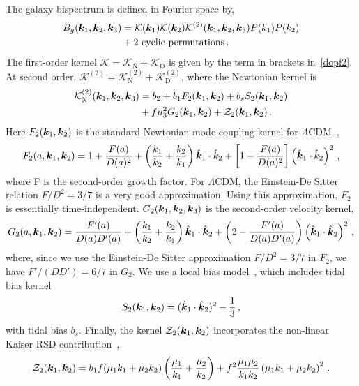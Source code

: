The galaxy bispectrum is defined in Fourier space by,
\begin{align}
B_{g}( \bm{k}_{1},  \bm{k}_{2},  \bm {k}_3) &= { \mathcal{K}( \bm {k}_{1})\mathcal{K}({\bm {k}}_{2}) \mathcal{K}^{(2)}(  \bm{k}_{1},  \bm{k}_{2}, \bm {k}_3)}
P(k_{1})P(k_{2}) \nonumber\\ 
&+\text{2 cyclic permutations}\,.\label{eq:fsbispdef}
\end{align}
The first-order kernel $\mathcal{K}=\mathcal{K}_{\mathrm{N}}+\mathcal{K}_{\mathrm{D}}$ is given by the term in brackets in~\eqref{dopf2}.
At second order, $\mathcal{K}^{(2)}=\mathcal{K}_{\mathrm{N}}^{(2)}+\mathcal{K}_{\mathrm{D}}^{(2)}$, where
 the Newtonian kernel is~\citep{Verde:1998zr}
\begin{align}
\mathcal{K}_{\mathrm{N}}^{(2)} (\bm {k}_1,\bm {k}_2,\bm {k}_3) &= b_{2} + b_{1}F_{2}(\bm {k}_1,\bm {k}_2) + b_s S_{2}(\bm {k}_1,\bm {k}_2) \nonumber \\
& + f \mu_3^{2} G_{2}(\bm {k}_1,\bm {k}_2)
+ {\cal Z}_2(\bm {k}_1,\bm {k}_2)\,.   \label{kn2}  
\end{align}
Here $F_2(\bm {k}_1,\bm {k}_2)$ is the standard Newtonian mode-coupling kernel for $\Lambda$CDM~\citep{Villa:2015ppa}, 
\begin{equation}
    F_2(a,\bm {k}_1,\bm {k}_2) = 1 + \frac{F(a)}{D(a)^2} + \left( \frac{k_1}{k_2} + \frac{k_2}{k_1} \right) \hat{\bm {k}}_1 \cdot \hat{k}_2 + \left[ 1 - \frac{F(a)}{D(a)^2} \right]\left( \hat{\bm {k}}_1 \cdot \hat{k}_2 \right)^2\,,
\end{equation}
where F is the second-order growth factor. For $\Lambda$CDM, the Einstein-De Sitter relation $F/D^2 = 3/7$ is a very good approximation. Using this approximation, $F_2$ is essentially time-independent. $G_2({\bm {k}_{1}},  {\bm {k}_{2}},\bm {k}_3)$ is the second-order velocity kernel, 
\begin{equation}
    G_2(a,\bm {k}_1,\bm {k}_2) = \frac{F'(a)}{D(a) D'(a)} + \left( \frac{k_1}{k_2} + \frac{k_2}{k_1} \right) \hat{\bm {k}}_1 \cdot \hat{\bm {k}}_2 + \left( 2 - \frac{F'(a)}{D(a) D'(a)} \right) \left( \hat{\bm {k}}_1 \cdot \hat{\bm {k}}_2 \right)^2\,,
\end{equation}
where, since we use the Einstein-De Sitter approximation $F/D^2 = 3/7$ in $F_2$, we have $F'/(D D') = 6/7$ in $G_2$. We use a local bias model~\citep{Desjacques:2016bnm}, which includes tidal bias kernel
\begin{equation}
    S_2(\bm {k}_1,\bm {k}_2) = (\hat{\bm {k}}_1 \cdot \hat{\bm {k}}_2)^2 - \frac{1}{3}\,, 
\end{equation}
with tidal bias $b_s$. Finally, the kernel $\mathcal{Z}_2(\bm {k}_1,\bm {k}_2)$ incorporates the non-linear Kaiser RSD contribution~\citep{Verde:1998zr,Scoccimarro:1999ed}, 
\begin{equation}
    \mathcal{Z}_2(\bm {k}_1,\bm {k}_2) = b_1 f (\mu_1 k_1 + \mu_2 k_2) \left( \frac{\mu_1}{k_1} + \frac{\mu_2}{k_2} \right) + f^2 \frac{\mu_1 \mu_2}{k_1 k_2} \left( \mu_1 k_1 + \mu_2 k_2 \right)^2\,.
\end{equation}

